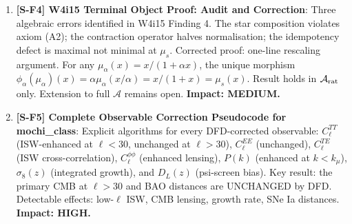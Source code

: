 \documentclass[11pt]{article}
\theoremstyle{definition}
\theoremstyle{remark}
\begin{document}
\begin{tcolorbox}[colback=blue!5!white, colframe=blue!60!black,
  title=\textbf{W4i16 Agent 9 --- TOP 5 FINDINGS}]
\begin{enumerate}[nosep]
\item \textbf{[S-F4] W4i15 Terminal Object Proof: Audit and Correction}:
  Three algebraic errors identified in W4i15 Finding 4. The star composition
  violates axiom (A2); the contraction operator halves normalisation; the
  idempotency defect is maximal not minimal at $\mu_s$. Corrected proof:
  one-line rescaling argument. For any $\mu_\alpha(x) = x/(1+\alpha x)$,
  the unique morphism $\phi_\alpha(\mu_\alpha)(x) = \alpha \mu_\alpha(x/\alpha)
  = x/(1+x) = \mu_s(x)$. Result holds in $\mathcal{A}_{\rm rat}$ only.
  Extension to full $\mathcal{A}$ remains open.
  \textbf{Impact: MEDIUM.}

\item \textbf{[S-F5] Complete Observable Correction Pseudocode for
  mochi\_class}: Explicit algorithms for every DFD-corrected observable:
  $C_\ell^{TT}$ (ISW-enhanced at $\ell < 30$, unchanged at $\ell > 30$),
  $C_\ell^{EE}$ (unchanged), $C_\ell^{TE}$ (ISW cross-correlation),
  $C_\ell^{\phi\phi}$ (enhanced lensing), $P(k)$ (enhanced at $k < k_\mu$),
  $\sigma_8(z)$ (integrated growth), and $D_L(z)$ (psi-screen bias).
  Key result: the primary CMB at $\ell > 30$ and BAO distances are
  UNCHANGED by DFD. Detectable effects: low-$\ell$ ISW, CMB lensing,
  growth rate, SNe Ia distances.
  \textbf{Impact: HIGH.}

\end{enumerate}
\end{tcolorbox}
\end{document}
